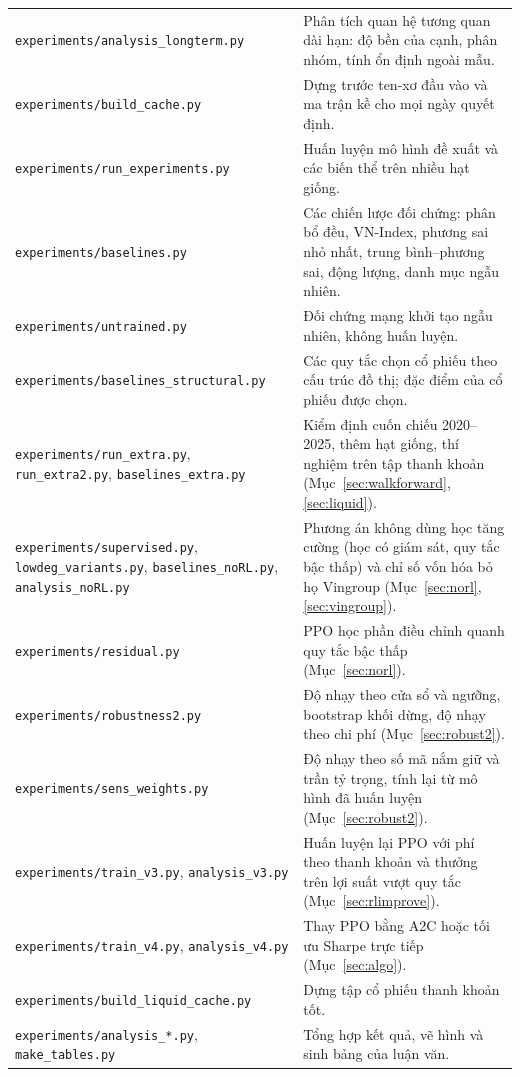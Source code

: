 \begin{table}[ht]
\begin{tabularx}{\textwidth}{@{}p{6.6cm}X@{}}
\texttt{experiments/analysis\_longterm.py} & Phân tích quan hệ tương quan dài hạn: độ bền của cạnh, phân nhóm, tính ổn định ngoài mẫu. \\
\texttt{experiments/build\_cache.py} & Dựng trước ten-xơ đầu vào và ma trận kề cho mọi ngày quyết định. \\
\texttt{experiments/run\_experiments.py} & Huấn luyện mô hình đề xuất và các biến thể trên nhiều hạt giống. \\
\texttt{experiments/baselines.py} & Các chiến lược đối chứng: phân bổ đều, VN-Index, phương sai nhỏ nhất, trung bình--phương sai, động lượng, danh mục ngẫu nhiên. \\
\texttt{experiments/untrained.py} & Đối chứng mạng khởi tạo ngẫu nhiên, không huấn luyện. \\
\texttt{experiments/baselines\_structural.py} & Các quy tắc chọn cổ phiếu theo cấu trúc đồ thị; đặc điểm của cổ phiếu được chọn. \\
\texttt{experiments/run\_extra.py}, \texttt{run\_extra2.py}, \texttt{baselines\_extra.py} & Kiểm định cuốn chiếu 2020--2025, thêm hạt giống, thí nghiệm trên tập thanh khoản (Mục~\ref{sec:walkforward}, \ref{sec:liquid}). \\
\texttt{experiments/supervised.py}, \texttt{lowdeg\_variants.py}, \texttt{baselines\_noRL.py}, \texttt{analysis\_noRL.py} & Phương án không dùng học tăng cường (học có giám sát, quy tắc bậc thấp) và chỉ số vốn hóa bỏ họ Vingroup (Mục~\ref{sec:norl}, \ref{sec:vingroup}). \\
\texttt{experiments/residual.py} & PPO học phần điều chỉnh quanh quy tắc bậc thấp (Mục~\ref{sec:norl}). \\
\texttt{experiments/robustness2.py} & Độ nhạy theo cửa sổ và ngưỡng, bootstrap khối dừng, độ nhạy theo chi phí (Mục~\ref{sec:robust2}). \\
\texttt{experiments/sens\_weights.py} & Độ nhạy theo số mã nắm giữ và trần tỷ trọng, tính lại từ mô hình đã huấn luyện (Mục~\ref{sec:robust2}). \\
\texttt{experiments/train\_v3.py}, \texttt{analysis\_v3.py} & Huấn luyện lại PPO với phí theo thanh khoản và thưởng trên lợi suất vượt quy tắc (Mục~\ref{sec:rlimprove}). \\
\texttt{experiments/train\_v4.py}, \texttt{analysis\_v4.py} & Thay PPO bằng A2C hoặc tối ưu Sharpe trực tiếp (Mục~\ref{sec:algo}). \\
\texttt{experiments/build\_liquid\_cache.py} & Dựng tập cổ phiếu thanh khoản tốt. \\
\texttt{experiments/analysis\_*.py}, \texttt{make\_tables.py} & Tổng hợp kết quả, vẽ hình và sinh bảng của luận văn. \\
\bottomrule
\end{tabularx}
\end{table}

